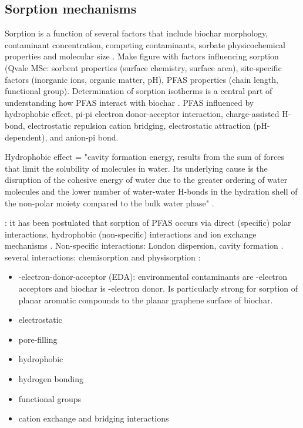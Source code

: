 \subsection{Sorption mechanisms}\label{sec:mechanisms}
Sorption is a function of several factors that include biochar morphology, contaminant concentration, competing contaminants, sorbate physicochemical properties and molecular size \citep{Li2019,du2014adsorption}. Make figure with factors influencing sorption (Qvale MSc: sorbent properties (surface chemistry, surface area), site-specific factors (inorganic ions, organic matter, pH), PFAS properties (chain length, functional group). Determination of sorption isotherms is a central part of understanding how PFAS interact with biochar \citep{Li2019}. 
PFAS influenced by hydrophobic effect, pi-pi electron donor-acceptor interaction, charge-assisted H-bond, electrostatic repulsion
cation bridging, electrostatic attraction (pH-dependent), and anion-pi bond.

Hydrophobic effect = "cavity formation energy, results from the sum of forces that limit the solubility of molecules in water. Its underlying cause is the disruption of the cohesive energy of water due to the greater ordering of water molecules and the lower number of water-water H-bonds in the hydration shell of the non-polar moiety compared to the bulk water phase" \citep{sigmund2022sorption}.

\citep{yu2009sorption}: it has been postulated that sorption of PFAS occurs via direct (specific) polar interactions, hydrophobic (non-specific) interactions and ion exchange mechanisms \citep{Hale2017fire}. 
Non-specific interactions: London dispersion, cavity formation \citep{Arp2006}. 
several interactions: chemisorption and physisorption \citep{Li2019}:
\begin{itemize}
    \item \textpi-\textpi electron-donor-acceptor (EDA): environmental contaminants are \textpi-electron acceptors and biochar is \textpi-electron donor. Is particularly strong for sorption of planar aromatic compounds to the planar graphene surface of biochar. 
    \item electrostatic
    \item pore-filling
    \item hydrophobic
    \item hydrogen bonding
    \item functional groups
    \item cation exchange and bridging interactions
\end{itemize} 

